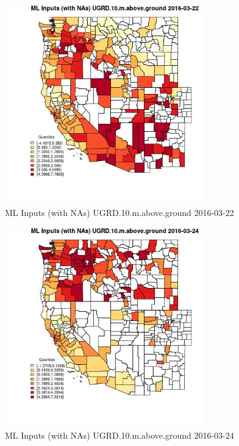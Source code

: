 \begin{figure} 
\centering  
\includegraphics[width=0.77\textwidth]{Code_Outputs/Report_ML_input_PM25_Step4_part_e_de_duplicated_aveswNAs_CountyUGRD10mabovegroundMean2016-03-22_2016-03-22.jpg} 
\caption{\label{fig:Report_ML_input_PM25_Step4_part_e_de_duplicated_aveswNAsCountyUGRD10mabovegroundMean2016-03-22_2016-03-22}ML Inputs (with NAs) UGRD.10.m.above.ground 2016-03-22} 
\end{figure} 
 

\begin{figure} 
\centering  
\includegraphics[width=0.77\textwidth]{Code_Outputs/Report_ML_input_PM25_Step4_part_e_de_duplicated_aveswNAs_CountyUGRD10mabovegroundMean2016-03-24_2016-03-24.jpg} 
\caption{\label{fig:Report_ML_input_PM25_Step4_part_e_de_duplicated_aveswNAsCountyUGRD10mabovegroundMean2016-03-24_2016-03-24}ML Inputs (with NAs) UGRD.10.m.above.ground 2016-03-24} 
\end{figure} 
 

